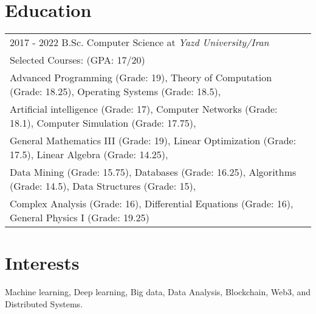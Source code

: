 \documentclass[letter,12pt]{article}
\begin{document}
\section{Education}
\begin{tabularx}{\linewidth}{@{}l X@{}}	

2017 - 2022 \normalsize \hspace{1cm}  B.Sc. Computer Science at \emph{Yazd University/Iran} \\

Selected Courses:   \hfill (GPA: 17/20) \\ 
\scriptsize \hspace{3cm} Advanced Programming (Grade: 19), Theory of Computation (Grade: 18.25), Operating Systems (Grade: 18.5),\\
\scriptsize \hspace{3cm} Artificial intelligence (Grade: 17), Computer Networks (Grade: 18.1), Computer Simulation (Grade: 17.75),\\
\scriptsize \hspace{3cm} General Mathematics III (Grade: 19), Linear Optimization (Grade: 17.5), Linear Algebra (Grade: 14.25),\\
\scriptsize \hspace{3cm} Data Mining (Grade: 15.75), Databases (Grade: 16.25), Algorithms (Grade: 14.5), Data Structures (Grade: 15),\\
\scriptsize \hspace{3cm} Complex Analysis (Grade: 16), Differential Equations (Grade: 16), General Physics I (Grade: 19.25)\\

\end{tabularx}




\section{Interests}
Machine learning, Deep learning, Big data, Data Analysis, Blockchain, Web3, and Distributed Systems.\\
\end{document}
